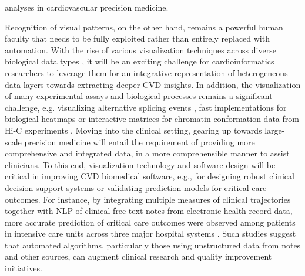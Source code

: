\documentclass[letter]{bib}
\begin{document}
analyses in cardiovascular precision medicine.  
	
	Recognition of visual patterns, on the other hand, remains a powerful human faculty that needs to be fully exploited rather than entirely replaced with automation.  With the rise of various visualization techniques across diverse biological data types \citep{Pavlopoulos:2015:Visualizing,ODonoghue:2018:Visualization}, it will be an exciting challenge for cardioinformatics researchers to leverage them for an integrative representation of heterogeneous data layers towards extracting deeper CVD insights. In addition, the visualization of many experimental assays and biological processes remains a significant challenge, e.g. visualizing alternative splicing events \citep{Katz:2015:Quantitative,Strobelt:2016:Vials}, fast implementations for biological heatmaps \citep{Khomtchouk:2017:shinyheatmap} or interactive matrices for chromatin conformation data from Hi-C experiments \citep{Kerpedjiev:2018:HiGlass,Lekschas:2018:HiPiler}. Moving into the clinical setting, gearing up towards large-scale precision medicine will entail the requirement of providing more comprehensive and integrated data, in a more comprehensible manner to assist clinicians.  To this end, visualization technology and software design will be critical in improving CVD biomedical software, e.g., for designing robust clinical decision support systems or validating prediction models for critical care outcomes.  For instance, by integrating multiple measures of clinical trajectories together with NLP of clinical free text notes from electronic health record data, more accurate prediction of critical care outcomes were observed among patients in intensive care units across three major hospital systems \citep{Marafino:2018:Validation}.  Such studies suggest that automated algorithms, particularly those using unstructured data from notes and other sources, can augment clinical research and quality improvement initiatives.
	
	
\end{document}
